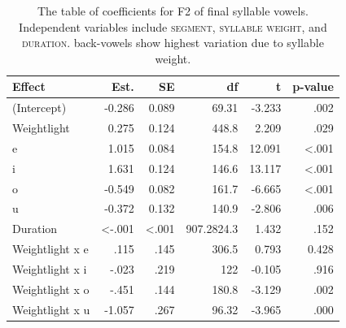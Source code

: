 \documentclass[12pt]{ouparticle}
\begin{document}
\begin{table} [h!]
\centering
\caption{The table of coefficients for F2 of final syllable vowels. Independent variables include \textsc{segment}, \textsc{syllable weight}, and \textsc{duration}. back-vowels show highest variation due to syllable weight.}
\label{tab:Syll2f2_SegWeight}
\begin{tabular}{l | r r r r r}
Effect & Est. & SE & df & t & p-value\\
\hline
(Intercept)    & -0.286 & 0.089 & 69.31 & -3.233 & .002 \\
Weightlight    & 0.275  & 0.124  & 448.8 &  2.209 & .029  \\
e              & 1.015  & 0.084   & 154.8 & 12.091 & <.001 \\
i              & 1.631  &  0.124  & 146.6 & 13.117 & <.001 \\
o              & -0.549 & 0.082  & 161.7  & -6.665 & <.001 \\
u              & -0.372 & 0.132  & 140.9    & -2.806 & .006 \\
Duration       & <-.001 & <.001  & 907.2824.3  & 1.432 & .152\\
Weightlight x e &  .115  & .145  & 306.5  &  0.793  & 0.428   \\
Weightlight x i &  -.023 & .219  & 122  &  -0.105 & .916   \\
Weightlight x o & -.451  & .144  & 180.8  & -3.129  & .002\\
Weightlight x u & -1.057  & .267  & 96.32  & -3.965  & .000 \\
\end{tabular}
\end{table}
\end{document}
